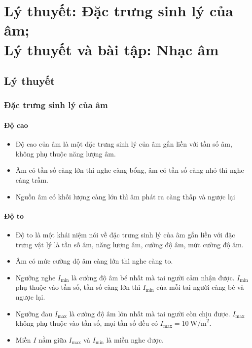 
\chapter[Lý thuyết: Đặc trưng sinh lý của âm;\\Lý thuyết và bài tập: Nhạc âm]{Lý thuyết: Đặc trưng sinh lý của âm;\\Lý thuyết và bài tập: Nhạc âm}
\section{Lý thuyết}
\subsection{Đặc trưng sinh lý của âm}
\subsubsection{Độ cao}
\begin{itemize}
	\item
	Độ cao của âm là một đặc trưng sinh lý của âm gắn liền với tần số âm, không phụ thuộc năng lượng âm.
	\item
	Âm có tần số càng lớn thì nghe càng bổng, âm có tần số càng nhỏ thì nghe càng trầm.
	
	\item Nguồn âm có khối lượng càng lớn thì âm phát ra càng thấp và ngược lại
\end{itemize}
\subsubsection{Độ to}
\begin{itemize}
	\item
	Độ to là một khái niệm nói về đặc trưng sinh lý của âm gắn liền với đặc trưng vật lý là tần số âm, năng lượng âm, cường độ âm,  mức cường độ âm.
	\item
	Âm có mức cường độ âm càng lớn thì nghe càng to.
	
	\item Ngưỡng nghe $I_\text{min}$ là cường độ âm bé nhất mà tai người cảm nhận được. $I_\text{min}$ phụ thuộc vào tần số, tần số càng lớn thì $I_\text{min}$ của mỗi tai người càng bé và ngược lại.
	
	\item Ngưỡng đau $I_\text{max}$ là cường độ âm lớn nhất mà tai người còn chịu được. $I_\text{max}$ không phụ thuộc vào tần số, mọi tần số đều có  $I_\text{max}=10\ \text{W/m}^2$.
	
	\item Miền $I$ nằm giữa  $I_\text{max}$ và  $I_\text{min}$ là miền nghe được.
\end{itemize} 
